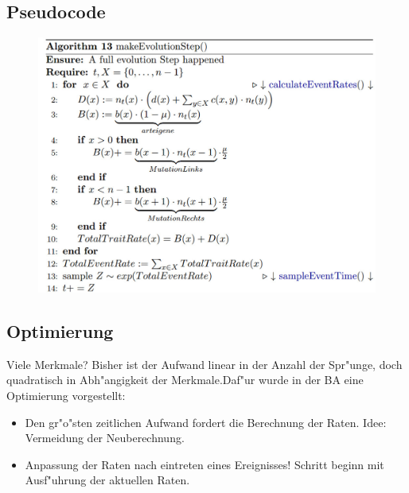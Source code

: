 \documentclass{beamer}
\begin{document}
\subsection{Pseudocode}
\begin{frame}
	\begin{figure}[H]
		\centering
		\includegraphics[width=1\linewidth]{./Pictures/Alg1}
	\end{figure}
\end{frame}

\subsection{Optimierung}
\begin{frame}{Viele Merkmale?}
Bisher ist der Aufwand linear in der Anzahl der Spr"unge, doch quadratisch in Abh"angigkeit der Merkmale.\pause Daf"ur wurde in der BA eine Optimierung vorgestellt:
	\begin{itemize}
		\item Den gr"o"sten zeitlichen Aufwand fordert die Berechnung der Raten. Idee: Vermeidung der Neuberechnung.\pause
		\item Anpassung der Raten nach eintreten eines Ereignisses! Schritt beginn mit Ausf"uhrung der aktuellen Raten.
	\end{itemize}
\end{frame}
\end{document}
